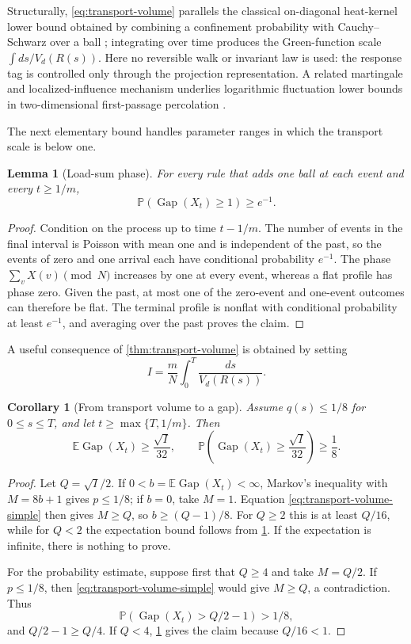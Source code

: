 \documentclass[11pt]{article}
\newtheorem{lemma}[lemma]{Lemma}
\newtheorem{corollary}[corollary]{Corollary}
\theoremstyle{remark}
\newcommand{\E}{\mathbb{E}}
\newcommand{\Pp}{\mathbb{P}}
\newcommand{\Gap}{\operatorname{Gap}}
\begin{document}
Structurally, \eqref{eq:transport-volume} parallels the classical on-diagonal heat-kernel lower bound obtained by combining a confinement probability with Cauchy--Schwarz over a ball \cite{CoulhonGrigoryan1997,Barlow2017}; integrating over time produces the Green-function scale $\int ds/V_d(R(s))$. Here no reversible walk or invariant law is used: the response tag is controlled only through the projection representation. A related martingale and localized-influence mechanism underlies logarithmic fluctuation lower bounds in two-dimensional first-passage percolation \cite{NewmanPiza1995}.

The next elementary bound handles parameter ranges in which the transport scale is below one.

\begin{lemma}[Load-sum phase]\label{lem:phase}
For every rule that adds one ball at each event and every $t\ge1/m$,
\[
 \Pp(\Gap(X_t)\ge1)\ge e^{-1}.
 \tag{5.11}\label{eq:phase-long}
\]
\end{lemma}

\begin{proof}
Condition on the process up to time $t-1/m$. The number of events in the final interval is Poisson with mean one and is independent of the past, so the events of zero and one arrival each have conditional probability $e^{-1}$. The phase $\sum_vX(v)\pmod N$ increases by one at every event, whereas a flat profile has phase zero. Given the past, at most one of the zero-event and one-event outcomes can therefore be flat. The terminal profile is nonflat with conditional probability at least $e^{-1}$, and averaging over the past proves the claim.
\end{proof}

A useful consequence of \cref{thm:transport-volume} is obtained by setting
\[
 I=\frac mN\int_0^T\frac{ds}{V_d(R(s))}.
 \tag{5.12}\label{eq:I-def}
\]

\begin{corollary}[From transport volume to a gap]\label{cor:transport-gap}
Assume $q(s)\le1/8$ for $0\le s\le T$, and let $t\ge\max\{T,1/m\}$. Then
\[
 \E\Gap(X_t)\ge\frac{\sqrt I}{32},
 \qquad
 \Pp\!\left(\Gap(X_t)\ge\frac{\sqrt I}{32}\right)\ge\frac18.
 \tag{5.13}\label{eq:I-gap}
\]
\end{corollary}

\begin{proof}
Let $Q=\sqrt I/2$. If $0<b=\E\Gap(X_t)<\infty$, Markov's inequality with $M=8b+1$ gives $p\le1/8$; if $b=0$, take $M=1$. Equation \eqref{eq:transport-volume-simple} then gives $M\ge Q$, so $b\ge(Q-1)/8$. For $Q\ge2$ this is at least $Q/16$, while for $Q<2$ the expectation bound follows from \cref{lem:phase}. If the expectation is infinite, there is nothing to prove.

For the probability estimate, suppose first that $Q\ge4$ and take $M=Q/2$. If $p\le1/8$, then \eqref{eq:transport-volume-simple} would give $M\ge Q$, a contradiction. Thus
\[
 \Pp(\Gap(X_t)>Q/2-1)>1/8,
\]
and $Q/2-1\ge Q/4$. If $Q<4$, \cref{lem:phase} gives the claim because $Q/16<1$.
\end{proof}
\end{document}
